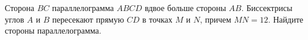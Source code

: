 \begin{ex}
	\begin{condition}
		Сторона \( BC  \) параллелограмма \( ABCD  \) вдвое больше стороны \( AB \). Биссектрисы углов \( A  \) и \( B  \) пересекают прямую \( CD \) в точках \( M  \) и \( N  \), причем \( MN = 12  \). Найдите стороны параллелограмма.
	\end{condition}
\end{ex}